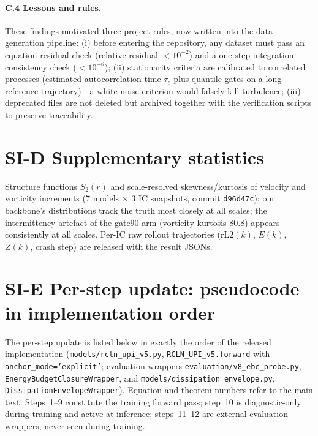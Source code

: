 \documentclass[11pt,a4paper]{article}
\begin{document}
\paragraph{C.4 Lessons and rules.} These findings motivated three project rules, now written into the data-generation pipeline: (i) before entering the repository, any dataset must pass an equation-residual check (relative residual $<10^{-2}$) and a one-step integration-consistency check ($<10^{-6}$); (ii) stationarity criteria are calibrated to correlated processes (estimated autocorrelation time $\tau_c$ plus quantile gates on a long reference trajectory)---a white-noise criterion would falsely kill turbulence; (iii) deprecated files are not deleted but archived together with the verification scripts to preserve traceability.

\section*{SI-D \quad Supplementary statistics}

Structure functions $S_2(r)$ and scale-resolved skewness/kurtosis of velocity and vorticity increments (7 models $\times$ 3 IC snapshots, commit \texttt{d96d47c}): our backbone's distributions track the truth most closely at all scales; the intermittency artefact of the gate90 arm (vorticity kurtosis $80.8$) appears consistently at all scales. Per-IC raw rollout trajectories (rL2$(k)$, $E(k)$, $Z(k)$, crash step) are released with the result JSONs.

\section*{SI-E \quad Per-step update: pseudocode in implementation order}

The per-step update is listed below in exactly the order of the released implementation (\texttt{models/rcln\_upi\_v5.py}, \texttt{RCLN\_UPI\_v5.forward} with \texttt{anchor\_mode='explicit'}; evaluation wrappers \texttt{evaluation/v8\_ebc\_probe.py}, \texttt{EnergyBudgetClosureWrapper}, and \texttt{models/dissipation\_envelope.py}, \texttt{DissipationEnvelopeWrapper}). Equation and theorem numbers refer to the main text. Steps~1--9 constitute the training forward pass; step~10 is diagnostic-only during training and active at inference; steps~11--12 are external evaluation wrappers, never seen during training.
\end{document}
